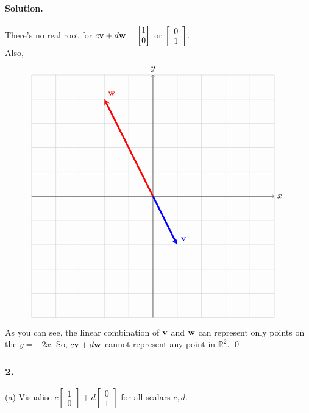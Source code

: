 \paragraph{Solution.}
There's no real root for $c\vb{v}+d\vb{w}=\begin{bmatrix}
    1\\0
\end{bmatrix}$ or $\begin{bmatrix}
    0\\1
\end{bmatrix}$.\\
Also,
\begin{gather*}
    \begin{tikzpicture}
        \draw[thin,gray!40] (-5,-5) grid (5,5);
        \draw[->] (-5,0)--(5,0) node[right]{$x$};
        \draw[->] (0,-5)--(0,5) node[above]{$y$};
        \draw[line width=2pt,blue,-stealth](0,0)--(1,-2) node[anchor=south west]{$\vb{v}$};
        \draw[line width=2pt,red,-stealth](0,0)--(-2,4) node[anchor=south west]{$\vb{w}$};
    \end{tikzpicture}
\end{gather*}
As you can see, the linear combination of $\vb{v}$ and $\vb{w}$ can represent only points on the $y=-2x$.
So, $c\vb{v}+d\vb{w}$ cannot represent any point in $\mathbb{R}^2$. \qed
\newpage
\subsubsection{2.}
(a) Visualise $c\begin{bmatrix}
    1\\0
\end{bmatrix}+d\begin{bmatrix}
    0\\1
\end{bmatrix}$ for all scalars $c, d$.
